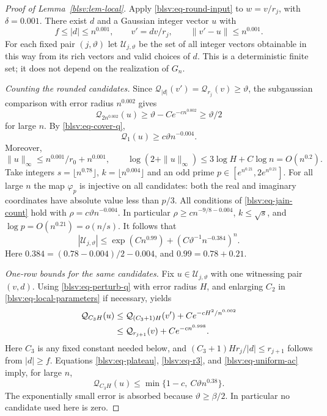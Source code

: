 \documentclass[11pt,reqno]{amsart}
\numberwithin{equation}{section}
\theoremstyle{plain}
\theoremstyle{definition}
\theoremstyle{remark}
\providecommand{\blsvQ}{\mathcal Q}
\begin{document}
\begin{proof}[Proof of Lemma~\ref{blsv:lem-local}]
Apply \eqref{blsv:eq-round-input} to $w=v/r_j$, with $\delta=0.001$.
There exist $d$ and a Gaussian integer vector $u$ with
\begin{equation}\label{blsv:eq-round}
 f\le|d|\le n^{0.001},\qquad
 v'=dv/r_j,\qquad \|v'-u\|\le n^{0.001}.
\end{equation}
For each fixed pair $(j,\vartheta)$ let $\mathcal U_{j,\vartheta}$ be the set of all
integer vectors obtainable in this way from its rich vectors and valid
choices of $d$. This is a deterministic finite set; it does not depend
on the realization of $G_n$.

\smallskip\noindent\emph{Counting the rounded candidates.}
Since $\blsvQ_{|d|}(v')=\blsvQ_{r_j}(v)\ge \vartheta$, the subgaussian
comparison with error radius $n^{0.002}$ gives
\[
 \blsvQ_{2n^{0.002}}(u)\ge \vartheta-Ce^{-c n^{0.002}}\ge \vartheta/2
\]
for large $n$. By \eqref{blsv:eq-cover-q},
\begin{equation}\label{blsv:eq-q1-u}
 \blsvQ_1(u)\ge c \vartheta n^{-0.004}.
\end{equation}
Moreover,
\[
 \|u\|_\infty\le n^{0.001}/r_0+n^{0.001},\qquad
 \log(2+\|u\|_\infty)\le 3\log H+C\log n=O(n^{0.2}).
\]
Take integers $s=\lfloor n^{0.78}\rfloor$, $k=\lfloor n^{0.004}\rfloor$
and an odd prime $p\in[e^{n^{0.21}},2e^{n^{0.21}}]$. For all large $n$
the map $\varphi_p$ is injective on all candidates: both the real and
imaginary coordinates have absolute value less than $p/3$.
All conditions of \eqref{blsv:eq-jain-count} hold with
$\rho=c\vartheta n^{-0.004}$. In particular $\rho\ge c n^{-9/8-0.004}$,
$k\le\sqrt{s}$, and $\log p=O(n^{0.21})=o(n/s)$.
It follows that
\begin{equation}\label{blsv:eq-candidate-count}
 |\mathcal U_{j,\vartheta}|
 \le \exp(Cn^{0.99})+
       (C\vartheta^{-1}n^{-0.384})^n.
\end{equation}
Here $0.384=(0.78-0.004)/2-0.004$, and $0.99=0.78+0.21$.

\smallskip\noindent\emph{One-row bounds for the same candidates.}
Fix $u\in\mathcal U_{j,\vartheta}$ with one witnessing pair $(v,d)$.
Using \eqref{blsv:eq-perturb-q} with error radius $H$, and enlarging $C_2$
in \eqref{blsv:eq-local-parameters} if necessary, yields
\begin{align}
 \blsvQ_{C_3H}(u)
 &\le \blsvQ_{(C_3+1)H}(v')+Ce^{-cH^2/n^{0.002}}\notag\\
 &\le \blsvQ_{r_{j+1}}(v)+Ce^{-c n^{0.998}}.
 \label{blsv:eq-row-comparison}
\end{align}
Here $C_3$ is any fixed constant needed below, and
$(C_3+1)Hr_j/|d|\le r_{j+1}$ follows from $|d|\ge f$.
Equations \eqref{blsv:eq-plateau}, \eqref{blsv:eq-r3}, and
\eqref{blsv:eq-uniform-ac} imply, for large $n$,
\begin{equation}\label{blsv:eq-row-bound}
 \blsvQ_{C_3H}(u)\le\min\{1-c,\ C\vartheta n^{0.38}\}.
\end{equation}
The exponentially small error is absorbed because $\vartheta\ge\beta/2$.
In particular no candidate used here is zero.


\end{proof}
\end{document}
